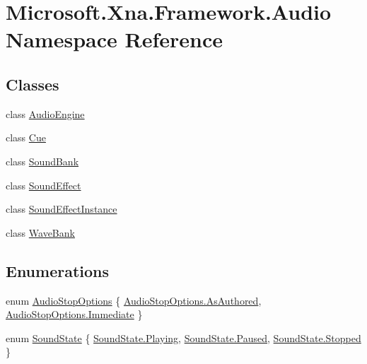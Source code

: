 \hypertarget{namespace_microsoft_1_1_xna_1_1_framework_1_1_audio}{}\section{Microsoft.\+Xna.\+Framework.\+Audio Namespace Reference}
\label{namespace_microsoft_1_1_xna_1_1_framework_1_1_audio}
\subsection*{Classes}
\begin{DoxyCompactItemize}
\item 
class \hyperlink{class_microsoft_1_1_xna_1_1_framework_1_1_audio_1_1_audio_engine}{Audio\+Engine}
\item 
class \hyperlink{class_microsoft_1_1_xna_1_1_framework_1_1_audio_1_1_cue}{Cue}
\item 
class \hyperlink{class_microsoft_1_1_xna_1_1_framework_1_1_audio_1_1_sound_bank}{Sound\+Bank}
\item 
class \hyperlink{class_microsoft_1_1_xna_1_1_framework_1_1_audio_1_1_sound_effect}{Sound\+Effect}
\item 
class \hyperlink{class_microsoft_1_1_xna_1_1_framework_1_1_audio_1_1_sound_effect_instance}{Sound\+Effect\+Instance}
\item 
class \hyperlink{class_microsoft_1_1_xna_1_1_framework_1_1_audio_1_1_wave_bank}{Wave\+Bank}
\end{DoxyCompactItemize}
\subsection*{Enumerations}
\begin{DoxyCompactItemize}
\item 
enum \hyperlink{namespace_microsoft_1_1_xna_1_1_framework_1_1_audio_ad6af2191f499fbe4c44d4f8ae2a0209b}{Audio\+Stop\+Options} \{ \hyperlink{namespace_microsoft_1_1_xna_1_1_framework_1_1_audio_ad6af2191f499fbe4c44d4f8ae2a0209baf6eea1c818e227b0154e61b0457b108d}{Audio\+Stop\+Options.\+As\+Authored}, 
\hyperlink{namespace_microsoft_1_1_xna_1_1_framework_1_1_audio_ad6af2191f499fbe4c44d4f8ae2a0209ba43f6615bbb2c40a5306ff804094420b1}{Audio\+Stop\+Options.\+Immediate}
 \}
\item 
enum \hyperlink{namespace_microsoft_1_1_xna_1_1_framework_1_1_audio_a5e3df4b21499807c0956e55e47a193b0}{Sound\+State} \{ \hyperlink{namespace_microsoft_1_1_xna_1_1_framework_1_1_audio_a5e3df4b21499807c0956e55e47a193b0ac9dbb2b7c84159b632d71e512eba8428}{Sound\+State.\+Playing}, 
\hyperlink{namespace_microsoft_1_1_xna_1_1_framework_1_1_audio_a5e3df4b21499807c0956e55e47a193b0ae99180abf47a8b3a856e0bcb2656990a}{Sound\+State.\+Paused}, 
\hyperlink{namespace_microsoft_1_1_xna_1_1_framework_1_1_audio_a5e3df4b21499807c0956e55e47a193b0ac23e2b09ebe6bf4cb5e2a9abe85c0be2}{Sound\+State.\+Stopped}
 \}
\end{DoxyCompactItemize}


